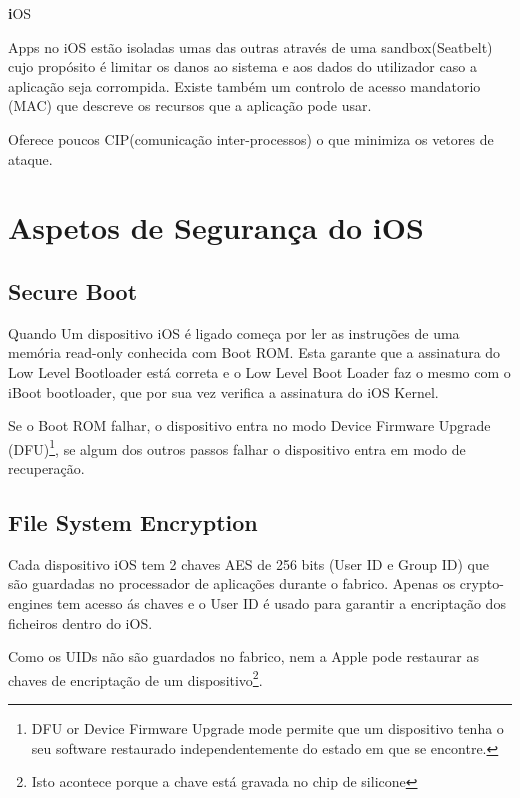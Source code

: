 
\newpage
\hfill\par
\hfill\par
\centerline{\Huge\textbf iOS}\par
\hfill\par
\hfill\par
Apps no iOS estão isoladas umas das outras através de uma sandbox(Seatbelt) cujo propósito é limitar os danos ao sistema e aos dados do utilizador caso a aplicação seja corrompida. Existe também um controlo de acesso mandatorio (MAC) que descreve os recursos que a aplicação pode usar.\par

Oferece poucos CIP(comunicação inter-processos) o que minimiza os vetores de ataque.

\section{Aspetos de Segurança do iOS}

\subsection{Secure Boot}
\hfill\par

		Quando Um dispositivo iOS é ligado começa por ler as instruções de uma memória read-only conhecida com Boot ROM.
		Esta garante que a assinatura do Low Level Bootloader está correta e o Low Level Boot Loader faz o mesmo com o iBoot bootloader, que por sua vez verifica a assinatura do iOS Kernel.\par
		Se o Boot ROM falhar, o dispositivo entra no modo Device Firmware Upgrade (DFU)\footnote[1]{DFU or Device Firmware Upgrade mode permite que um dispositivo tenha o seu software restaurado independentemente do estado em que se encontre.}, se algum dos outros passos falhar o dispositivo entra em modo de recuperação.


\subsection{File System Encryption}
\hfill\par
	Cada dispositivo iOS tem 2 chaves AES de 256 bits (User ID e Group ID) que são guardadas no processador de aplicações durante o fabrico. Apenas os crypto-engines tem acesso ás chaves e o User ID é usado para garantir a encriptação dos ficheiros dentro do iOS.\par
	Como os UIDs não são guardados no fabrico, nem a Apple pode restaurar as chaves de encriptação de um dispositivo\footnote[2]{Isto acontece porque a chave está gravada no chip de silicone}.\par


